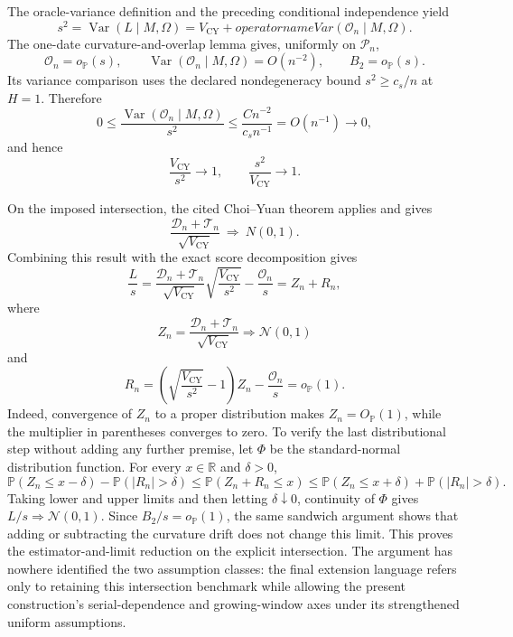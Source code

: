 The oracle-variance definition and the preceding conditional independence yield
\[
 s^2
 =\operatorname{Var}(L\mid M,\Omega)
 =V_{\mathrm{CY}}+operatorname{Var}(\mathcal O_n\mid M,\Omega).
\]
The one-date curvature-and-overlap lemma gives, uniformly on \(\mathcal P_n\),
\[
 \mathcal O_n=o_{\mathbb P}(s),
 \qquad
 \operatorname{Var}(\mathcal O_n\mid M,\Omega)=O(n^{-2}),
 \qquad
 B_2=o_{\mathbb P}(s).
\]
Its variance comparison uses the declared nondegeneracy bound \(s^2\ge c_s/n\) at \(H=1\).  Therefore
\[
 0\le
 \frac{\operatorname{Var}(\mathcal O_n\mid M,\Omega)}{s^2}
 \le \frac{C n^{-2}}{c_s n^{-1}}
 =O(n^{-1})\longrightarrow0,
\]
and hence
\[
 \frac{V_{\mathrm{CY}}}{s^2}\longrightarrow1,
 \qquad
 \frac{s^2}{V_{\mathrm{CY}}}\longrightarrow1.
\]

On the imposed intersection, the cited Choi--Yuan theorem applies and gives
\[
 \frac{\mathcal D_n+\mathcal T_n}{\sqrt{V_{\mathrm{CY}}}}
 \ \Rightarrow\ N(0,1).
\]
Combining this result with the exact score decomposition gives
\[
 \frac{L}{s}
 =\frac{\mathcal D_n+\mathcal T_n}{\sqrt{V_{\mathrm{CY}}}}
   \sqrt{\frac{V_{\mathrm{CY}}}{s^2}}
   -\frac{\mathcal O_n}{s}
 =Z_n+R_n,
\]
where
\[
 Z_n=\frac{\mathcal D_n+\mathcal T_n}{\sqrt{V_{\mathrm{CY}}}}
 \Rightarrow \mathcal N(0,1)
\]
and
\[
 R_n=
 \left(\sqrt{\frac{V_{\mathrm{CY}}}{s^2}}-1\right)Z_n
 -\frac{\mathcal O_n}{s}
 =o_{\mathbb P}(1).
\]
Indeed, convergence of \(Z_n\) to a proper distribution makes \(Z_n=O_{\mathbb P}(1)\), while the multiplier in parentheses converges to zero.  To verify the last distributional step without adding any further premise, let \(\Phi\) be the standard-normal distribution function.  For every \(x\in\mathbb R\) and \(\delta>0\),
\[
 \mathbb P(Z_n\le x-\delta)-\mathbb P(|R_n|>\delta)
 \le \mathbb P(Z_n+R_n\le x)
 \le \mathbb P(Z_n\le x+\delta)+\mathbb P(|R_n|>\delta).
\]
Taking lower and upper limits and then letting \(\delta\downarrow0\), continuity of \(\Phi\) gives \(L/s\Rightarrow\mathcal N(0,1)\).  Since \(B_2/s=o_{\mathbb P}(1)\), the same sandwich argument shows that adding or subtracting the curvature drift does not change this limit.  This proves the estimator-and-limit reduction on the explicit intersection.  The argument has nowhere identified the two assumption classes: the final extension language refers only to retaining this intersection benchmark while allowing the present construction's serial-dependence and growing-window axes under its strengthened uniform assumptions.
